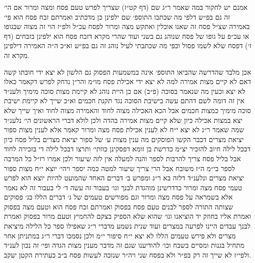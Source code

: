 \documentclass[12pt, openany]{book}
\begin{document}
\begin{multicols}{2}
אמנם יש לחקור במה שאמר ר״ג שם (דף קט״ז) שצריך לפרש טעם פסח ומצה ומרור אם הי׳ זה גם בפ״ש דלפי מה שכתבו התוספ׳ שם ילפינן כן מדכתיב ואמרתם זבח פסח הוא פי׳ באמירה שצ״ל פסח זה שאנו אוכלין ואתקש מצה ומרור לפסח עכ״ל ולפ״ז הוי זה מצוה שבגופו או עכ״פ על גופו של פסח שנוהג גם בשני ועוד שהרי מקרא דזבח פסח הוא ילפינן בזבחים (דף ז׳) דפסח שלא לשמו פסול וכפי מה שכתבתי לעיל נוהג זה גם בפ״ש וא״כ ה״ה האמירה דילפינן מקרא זה.\\\vspace{0pt}

אכן מלבד שהדרשה שהביאו התוספ׳ אינה במשמעות הפסוק גם הלשון לא יצא ידי חובתו קשה דאם לא קיים מצות אמירה למה לא יצא ידי אכילת פסח מו״מ והר״ן נדחק לפרש דקאמר כאלו לא יצא וכעין מה שנאמר בסוכה (פ״ב) אם כן היית נוהג לא קיימת מצות סוכה מימיך ולענ״ד אין זה דומה לשם דהתם עשה בישיבת הסוכה נגד תקנת חכמים וא״כ שייך לא קיימת ישיבת סוכה מימיך כמצות חכמים אבל הכא האכילה מצוה לחוד והאמירה מצוה לחוד ואיך שייך שלא יצא במצות אכילה כיון שלא קיים מצות אמירה בהדה ולכן לולא דברי הראשונים הי׳ נלענ״ד שמה שאמר ר״ג לא יצא י״ח לא לענין אכילת פסח מצה ומרור קאמר אלא לענין מצות ספור יציאת מצרים דכבר הקשו הפוסקים מה ענין מצות ע׳ של ספור יציאת מצרים בליל פסח כיון דבכל לילה חיוב להזכיר יצ״מ כדרשת בן זומא דפסקינן כוותי׳ ותרצו דבכל לילה די בזכירה לחוד אבל בליל פסח צריך להרבות לספר והנה למעלה אין לזה שיעור ולכן אמרו רז״ל כל המרבה לספר בי״מ ה״ז משובח אבל הרי צריך שיעור למטה כמה יספר ויהי׳ יוצא י״ח מצות ספור יציאת מצרים ונלענ״ד דלזה בא ר״ג ומפרש ב׳ דברים האחד שהמועט להיות יוצא הוא לפרש טעמי פסח מצה ומרור כדדרשינן מוהגדת לבנך וגו׳ בעבור זה עשה ד׳ לי בעבור זה לא נאמר אלא בשמראה על פסח מצה ומרור וגם מפורשים טעמים של ג׳ דברים הללו בג׳ פסוקים שצותה התורה לספר לבנים טעם פסח בפסוק ואמרתם זבח פסח הוא וטעם מצה בפסוק ואמרת אליו בחוזק יד הוציאנו וגו׳ שהוא שלא הספיק בצקם להחמיץ וטעם מרור בפסוק ואמרת לבנך עבדים היינו לפרעה במצרים ועוד שנית נשמע מדברי ר״ג שאפילו ספר כל הלילה מיציאת מצרים ולא פירש טעמים הללו לא יצא י״ח סיפור י״מ ולכן נסמכו דברי ר״ג במתניתן אחר מתחיל בגנות ומסיים בשבח וכו׳ להודיענו שגם זה מדבר מענין מצות הגדה ופי׳ זה נכון לענ״ד ולפי״ז לא שייך זה רק בפ״ר ולא בפסח שני ויה״ר שנזכה לעשות פסח ב״ב כעתירת הקטן יעקב.\\\vspace{0pt}

\end{multicols}\newpage
\end{document}
